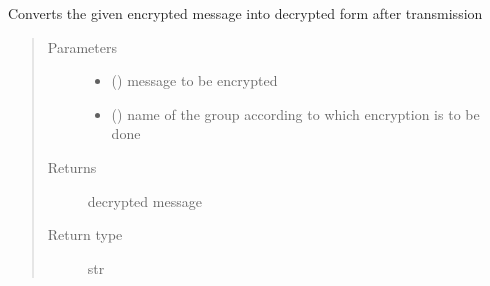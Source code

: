 \documentclass[letterpaper,10pt,english]{sphinxmanual}
\begin{document}

\begin{fulllineitems}
\label{\detokenize{grpencrypt:grpencrypt.group_decrypt}}
Converts the given encrypted message into decrypted form after transmission
\begin{quote}\begin{description}
\item[{Parameters}] \leavevmode\begin{itemize}
\item {} 
 () \textendash{} message to be encrypted

\item {} 
 () \textendash{} name of the group according to which encryption is to be done

\end{itemize}

\item[{Returns}] \leavevmode
decrypted message

\item[{Return type}] \leavevmode
str

\end{description}\end{quote}

\end{fulllineitems}

\end{document}
